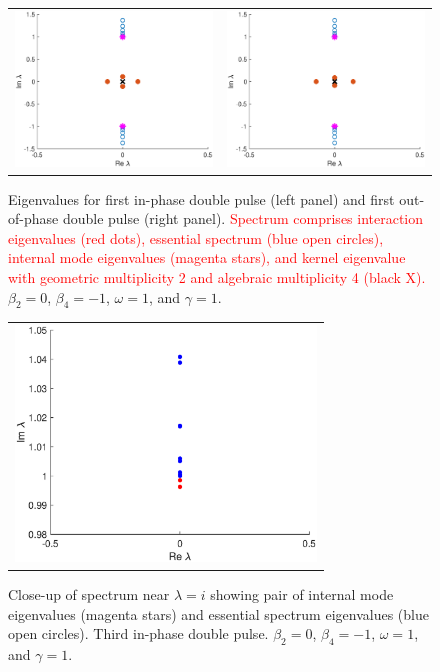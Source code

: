\documentclass[12pt]{elsarticle}
\newcommand{\revised}[1]{ \textcolor{red}{#1} }
\begin{document}
\begin{figure}[H]
\centering
\begin{tabular}{cc}
\includegraphics[width=8cm]{images/DP1specpp.eps} &
\includegraphics[width=8cm]{images/DP1specmp.eps}
\end{tabular}
\caption{Eigenvalues for first in-phase double pulse (left panel) and first out-of-phase double pulse (right panel). \revised{Spectrum comprises interaction eigenvalues (red dots), essential spectrum (blue open circles), internal mode eigenvalues (magenta stars), and kernel eigenvalue with geometric multiplicity 2 and algebraic multiplicity 4 (black X).} $\beta_2 = 0$, $\beta_4 = -1$, $\omega = 1$, and $\gamma = 1$.}
\label{fig:doublespec}
\end{figure} 

\begin{figure}[H]
\centering
\begin{tabular}{c}
\includegraphics[width=8cm]{images/DP3internalmode.eps}
\end{tabular}
\caption{Close-up of spectrum near $\lambda = i$ showing pair of internal mode eigenvalues (magenta stars) and essential spectrum eigenvalues (blue open circles). Third in-phase double pulse. $\beta_2 = 0$, $\beta_4 = -1$, $\omega = 1$, and $\gamma = 1$.}
\label{fig:doubleinternalmode}
\end{figure}
\end{document}
